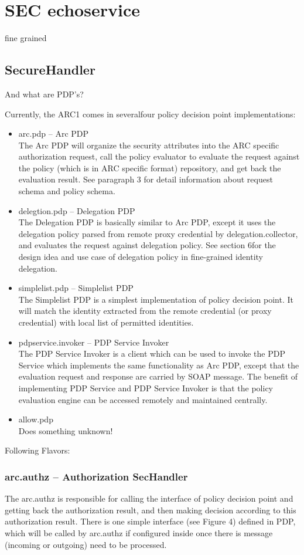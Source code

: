 \chapter{SEC echoservice}

fine grained


\section{SecureHandler}
And what are PDP's?

Currently, the ARC1 comes in severalfour policy decision point implementations:
\begin{itemize}
 \item arc.pdp – Arc PDP\\
The Arc PDP will organize the security attributes into the ARC specific authorization request, call the
policy evaluator to evaluate the request against the policy (which is in ARC specific format) repository,
and get back the evaluation result. See paragraph 3 for detail information about request schema and policy
schema.
\item delegtion.pdp – Delegation PDP\\
The Delegation PDP is basically similar to Arc PDP, except it uses the delegation policy parsed from
remote proxy credential by delegation.collector, and evaluates the request against delegation policy. See
section 6for the design idea and use case of delegation policy in fine-grained identity delegation.
\item simplelist.pdp – Simplelist PDP\\
The Simplelist PDP is a simplest implementation of policy decision point. It will match the identity
extracted from the remote credential (or proxy credential) with local list of permitted identities.
\item pdpservice.invoker – PDP Service Invoker\\
The PDP Service Invoker is a client which can be used to invoke the PDP Service which implements the
same functionality as Arc PDP, except that the evaluation request and response are carried by SOAP
message. The benefit of implementing PDP Service and PDP Service Invoker is that the policy evaluation
engine can be accessed remotely and maintained centrally.
 \item allow.pdp\\
 Does something unknown!
\end{itemize}

Following Flavors:
\subsection{arc.authz – Authorization SecHandler}
The arc.authz is responsible for calling the interface of policy decision point and getting back the
authorization result, and then making decision according to this authorization result. There is one simple
interface (see Figure 4) defined in PDP, which will be called by arc.authz if configured inside once there
is message (incoming or outgoing) need to be processed.

